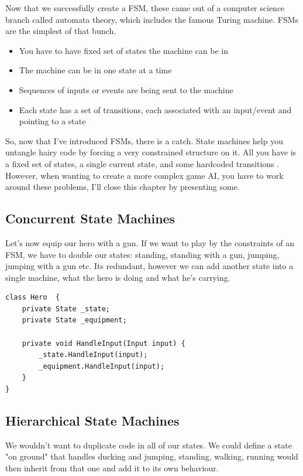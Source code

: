\documentclass[a4paper, 12pt]{book}
\begin{document}
Now that we successfully create a FSM, these came out of a computer science branch called automata theory, which includes the famous Turing machine. FSMs are the simplest of that bunch.

\begin{itemize}
    \item You have to have fixed set of states the machine can be in
    \item The machine can be in one state at a time
    \item Sequences of inputs or events are being sent to the machine
    \item Each state has a set of transitions, each associated  with an input/event and pointing to a state
\end{itemize}

So, now that I've introduced FSMs, there is a catch. State machines help you untangle hairy code by forcing a very constrained structure on it. All you have is a fixed set of states, a single current state, and some hardcoded transitions \cite{GameProgrammingPattersFMS}. However, when wanting to create a more complex game AI, you have to work around these problems, I'll close this chapter by presenting some. 

\subsection{Concurrent State Machines}

Let's now equip our hero with a gun. If we want to play by the constraints of an FSM, we have to double our states: standing, standing with a gun, jumping, jumping with a gun etc. Its redundant, however we can add another state into a single machine, what the hero is doing and what he's carrying.

\begin{verbatim}
class Hero  {
    private State _state;
    private State _equipment;

    private void HandleInput(Input input) {
        _state.HandleInput(input);
        _equipment.HandleInput(input);
    }
}
\end{verbatim}

\subsection{Hierarchical State Machines}

We wouldn't want to duplicate code in all of our states. We could define a state "on ground" that handles ducking and jumping, standing, walking, running would then inherit from that one and add it to its own behaviour.
\end{document}
